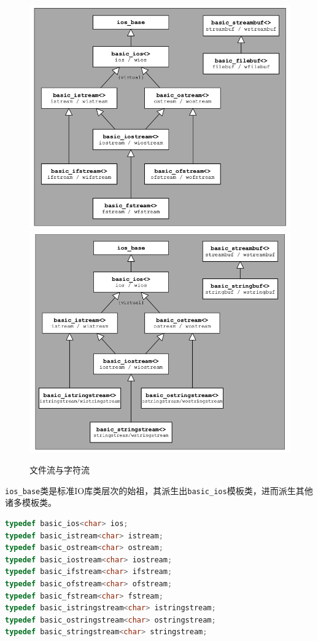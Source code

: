 \begin{figure}[ht]
	\begin{center}
		\includegraphics[keepaspectratio,width=0.4\paperwidth]{Pictures/CppStdFileStream.png}
		\includegraphics[keepaspectratio,width=0.4\paperwidth]{Pictures/CppStdStringStream.png}
	\caption{文件流与字符流}
	\label{fig:CppStdIoStreams}
	\end{center}
\end{figure}

\verb$ios_base$类是标准IO库类层次的始祖，其派生出\verb$basic_ios$模板类，进而派生其他诸多模板类。
\begin{lstlisting}[language=C++]
typedef basic_ios<char> ios;
typedef basic_istream<char> istream;
typedef basic_ostream<char> ostream;
typedef basic_iostream<char> iostream;
typedef basic_ifstream<char> ifstream;
typedef basic_ofstream<char> ofstream;
typedef basic_fstream<char> fstream;
typedef basic_istringstream<char> istringstream;
typedef basic_ostringstream<char> ostringstream;
typedef basic_stringstream<char> stringstream;
\end{lstlisting}




